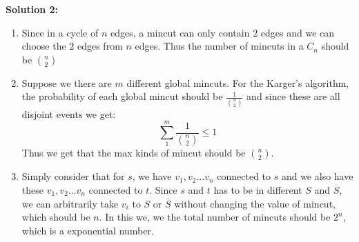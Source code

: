 \documentclass[12pt, notitlepage]{article}
\begin{document}
\textbf{Solution 2:}\\
\begin{enumerate}[1.]
\item Since in a cycle of $n$ edges, a mincut can only contain $2$ edges
    and we can choose the $2$ edges from $n$ edges. Thus the number of
        mincuts in a $C_n$ should be $\binom{n}{2}$
\item Suppose we there are $m$ different global mincuts. For the Karger's algorithm, the probability of each global mincut
    should be $\frac{1}{\binom{n}{2}}$ and since these are all disjoint events we get:
        \[
            \sum_{1}^{m} \frac{1}{\binom{n}{2}} \leq 1
            \]
        Thus we get that the max kinds of mincut should be $\binom{n}{2}$.

\item Simply consider that for $s$, we have $v_1, v_2 \ldots v_n$ connected to $s$ and we also have these
    $v_1, v_2 \ldots v_n$ connected to $t$. Since $s$ and $t$ has to be in different $S$ and $\overline{S}$,
    we can arbitrarily take $v_i$ to $S$ or $\overline{S}$ without changing the value of mincut, which should be $n$.
    In this we, we the total number of mincuts should be $2^n$, which is a exponential number.
\end{enumerate}
\end{document}
